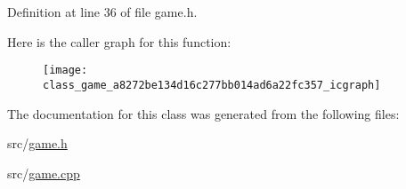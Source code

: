 Definition at line 36 of file game.\-h.



Here is the caller graph for this function\-:
\nopagebreak
\begin{figure}[H]
\begin{center}
\leavevmode
\texttt{[image: class\_game\_a8272be134d16c277bb014ad6a22fc357\_icgraph]}
\end{center}
\end{figure}




The documentation for this class was generated from the following files\-:\begin{DoxyCompactItemize}
\item 
src/\hyperlink{game_8h}{game.\-h}\item 
src/\hyperlink{game_8cpp}{game.\-cpp}\end{DoxyCompactItemize}
